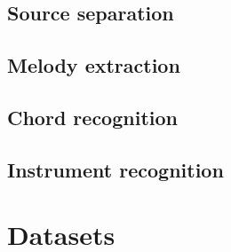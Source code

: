 \documentclass[journal]{IEEEtran}
\begin{document}
\subsection{Source separation}
\subsection{Melody extraction}
\subsection{Chord recognition}
\subsection{Instrument recognition}

\section{Datasets}

\ifCLASSOPTIONcaptionsoff
  \newpage
\fi


%
%



\end{document}
